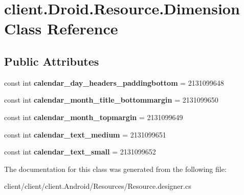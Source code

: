 \hypertarget{classclient_1_1Droid_1_1Resource_1_1Dimension}{\section{client.\-Droid.\-Resource.\-Dimension Class Reference}
\label{classclient_1_1Droid_1_1Resource_1_1Dimension}
}
\subsection*{Public Attributes}
\begin{DoxyCompactItemize}
\item 
\hypertarget{classclient_1_1Droid_1_1Resource_1_1Dimension_ae0fce97be552d4cc11e6d6c919fba822}{const int {\bfseries calendar\-\_\-day\-\_\-headers\-\_\-paddingbottom} = 2131099648}\label{classclient_1_1Droid_1_1Resource_1_1Dimension_ae0fce97be552d4cc11e6d6c919fba822}

\item 
\hypertarget{classclient_1_1Droid_1_1Resource_1_1Dimension_add7f142fecbba63e9064921a251b9c05}{const int {\bfseries calendar\-\_\-month\-\_\-title\-\_\-bottommargin} = 2131099650}\label{classclient_1_1Droid_1_1Resource_1_1Dimension_add7f142fecbba63e9064921a251b9c05}

\item 
\hypertarget{classclient_1_1Droid_1_1Resource_1_1Dimension_ac46023da3106cb31d54606c0aeba6027}{const int {\bfseries calendar\-\_\-month\-\_\-topmargin} = 2131099649}\label{classclient_1_1Droid_1_1Resource_1_1Dimension_ac46023da3106cb31d54606c0aeba6027}

\item 
\hypertarget{classclient_1_1Droid_1_1Resource_1_1Dimension_a201dbe0f8d1dbf0a4665652ca0c214a0}{const int {\bfseries calendar\-\_\-text\-\_\-medium} = 2131099651}\label{classclient_1_1Droid_1_1Resource_1_1Dimension_a201dbe0f8d1dbf0a4665652ca0c214a0}

\item 
\hypertarget{classclient_1_1Droid_1_1Resource_1_1Dimension_a2d132e1060a669a4455aaf777259e3ab}{const int {\bfseries calendar\-\_\-text\-\_\-small} = 2131099652}\label{classclient_1_1Droid_1_1Resource_1_1Dimension_a2d132e1060a669a4455aaf777259e3ab}

\end{DoxyCompactItemize}


The documentation for this class was generated from the following file\-:\begin{DoxyCompactItemize}
\item 
client/client/client.\-Android/\-Resources/Resource.\-designer.\-cs\end{DoxyCompactItemize}

